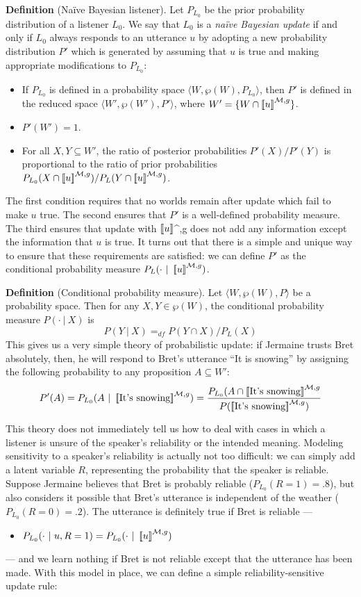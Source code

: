 \documentclass[12pt]{article}
\newcommand{\llbracket}{\ensuremath{\left [\!\left [}}%
\newcommand{\rrbracket}{\ensuremath{\right ]\!\right ]}}
\providecommand{\sv}[1]{\ensuremath{\llbracket #1 \rrbracket}}
\newcommand{\bei}{\begin{itemize}}
\newcommand{\eni}{\end{itemize}}
\newcommand{\lar}[1]{\ensuremath{\langle #1 \rangle}}
\newcounter{definition}
\newcommand{\defin}[2]{
\vspace{.1in}
\noindent \textbf{Definition \arabic{definition}} (#1). #2
\vspace{.1in}
\addtocounter{definition}{1}
}
\begin{document}
\defin{Na\"ive Bayesian listener}{Let $P_{L_0}$ be the prior probability distribution of a listener $L_0$. We say that $L_0$ is a \emph{na\"ive Bayesian update} if and only if $L_0$ always responds to an utterance $u$ by adopting a new probability distribution $P'$ which is generated by assuming that $u$ is true and making appropriate modifications to $P_{L_0}$: 
\bei
\item If $P_{L_0}$ is defined in a probability space \lar{W, \wp(W), P_{L_0}}, then $P'$ is defined in the reduced space \lar{W', \wp(W'), P'}, where $W' = \{W \cap \sv{u}^{\mathcal{M},g}\}$.
\item $P'(W') = 1$. 
\item For all $X, Y \subseteq W'$, the ratio of posterior probabilities  
$P'(X)/P'(Y)$ is proportional to the ratio of prior probabilities $P_{L_0}(X \cap \sv{u}^{\mathcal{M},g})/P_L(Y \cap \sv{u}^{\mathcal{M},g})$.
\eni
}
The first condition requires that no worlds remain after update which fail to make $u$ true. The second ensures that $P'$ is a well-defined probability measure. The third ensures that update with \sv{u}^{,g} does not add any information except the information that $u$ is true. It turns out that there is a simple and unique way to ensure that these requirements are satisfied: we can define $P'$ as the conditional probability measure $P_L(\cdot \ |\ \sv{u}^{\mathcal{M},g})$.

\defin{Conditional probability measure}{
Let \lar{W, \wp(W), P} be a probability space. Then for any $X, Y \in \wp(W)$, the conditional probability measure $P(\cdot \ |\ X)$ is
$$
P(Y \ |\ X) =_{\mathit{df}} P(Y \cap X) / P_L(X)
$$
This gives us a very simple theory of probabilistic update: if Jermaine trusts Bret absolutely, then, he will respond to Bret's utterance ``It is snowing'' by assigning the following probability to any proposition $A \subseteq W'$: 
$$
P'(A) = P_{L_0}(A \ |\ \sv{\text{It's snowing}}^{\mathcal{M},g}) = \frac{P_{L_0}(A \cap \sv{\text{It's snowing}}^{\mathcal{M},g}}{P(\sv{\text{It's snowing}}^{\mathcal{M},g})}
$$
}

This theory does not immediately tell us how to deal with cases in which a listener is unsure of the speaker's reliability or the intended meaning. Modeling sensitivity to a speaker's reliability is actually not too difficult: we can simply add a latent variable $R$, representing the probability that the speaker is reliable. Suppose Jermaine believes that Bret is probably reliable ($P_{L_0}(R=1) = .8$), but also considers it possible that Bret's utterance is independent of the weather ($P_{L_0}(R=0) = .2$). The utterance is definitely true if Bret is reliable --- 
\bei
\item $P_{L_0}(\cdot \ |\ u, R=1) = P_{L_0}(\cdot \ |\ \sv{u}^{\mathcal{M},g})$
\eni
--- and we learn nothing if Bret is not reliable except that the utterance has been made. With this model in place, we can define a simple reliability-sensitive update rule:
\end{document}
